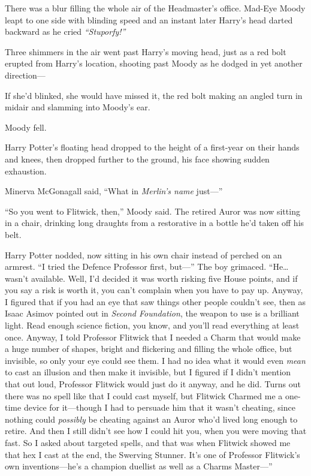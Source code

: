 There was a blur filling the whole air of the Headmaster's office.
Mad-Eye Moody leapt to one side with blinding speed and an instant later
Harry's head darted backward as he cried \emph{``Stuporfy!''}

Three shimmers in the air went past Harry's moving head, just as a red
bolt erupted from Harry's location, shooting past Moody as he dodged in
yet another direction---

If she'd blinked, she would have missed it, the red bolt making an
angled turn in midair and slamming into Moody's ear.

Moody fell.

Harry Potter's floating head dropped to the height of a first-year on
their hands and knees, then dropped further to the ground, his face
showing sudden exhaustion.

Minerva McGonagall said, ``What in \emph{Merlin's name} just---''

``So you went to Flitwick, then,'' Moody said. The retired Auror was now
sitting in a chair, drinking long draughts from a restorative in a
bottle he'd taken off his belt.

Harry Potter nodded, now sitting in his own chair instead of perched on
an armrest. ``I tried the Defence Professor first, but---'' The boy
grimaced. ``He\ldots{} wasn't available. Well, I'd decided it was worth
risking five House points, and if you say a risk is worth it, you can't
complain when you have to pay up. Anyway, I figured that if you had an
eye that saw things other people couldn't see, then as Isaac Asimov
pointed out in \emph{Second Foundation}, the weapon to use is a
brilliant light. Read enough science fiction, you know, and you'll read
everything at least once. Anyway, I told Professor Flitwick that I
needed a Charm that would make a huge number of shapes, bright and
flickering and filling the whole office, but invisible, so only your eye
could see them. I had no idea what it would even \emph{mean} to cast an
illusion and then make it invisible, but I figured if I didn't mention
that out loud, Professor Flitwick would just do it anyway, and he did.
Turns out there was no spell like that I could cast myself, but Flitwick
Charmed me a one-time device for it---though I had to persuade him that
it wasn't cheating, since nothing could \emph{possibly} be cheating
against an Auror who'd lived long enough to retire. And then I still
didn't see how I could hit you, when you were moving that fast. So I
asked about targeted spells, and that was when Flitwick showed me that
hex I cast at the end, the Swerving Stunner. It's one of Professor
Flitwick's own inventions---he's a champion duellist as well as a Charms
Master---''


